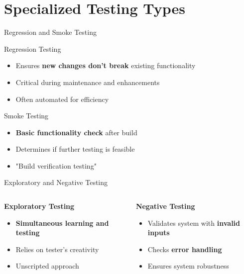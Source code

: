 \documentclass{beamer}
\begin{document}
\section{Specialized Testing Types}

\begin{frame}[t]{Regression and Smoke Testing}
\begin{block}{Regression Testing}
\begin{itemize}
\item Ensures \textbf{new changes don't break} existing functionality
\item Critical during maintenance and enhancements
\item Often automated for efficiency
\end{itemize}
\end{block}

\begin{block}{Smoke Testing}
\begin{itemize}
\item \textbf{Basic functionality check} after build
\item Determines if further testing is feasible
\item "Build verification testing"
\end{itemize}
\end{block}
\end{frame}

\begin{frame}[t]{Exploratory and Negative Testing}
\begin{columns}[T]
\begin{column}{0.48\textwidth}
\textbf{Exploratory Testing}
\begin{itemize}
\item \textbf{Simultaneous learning and testing}
\item Relies on tester's creativity
\item Unscripted approach
\end{itemize}
\end{column}
\begin{column}{0.48\textwidth}
\textbf{Negative Testing}
\begin{itemize}
\item Validates system with \textbf{invalid inputs}
\item Checks \textbf{error handling}
\item Ensures system robustness
\end{itemize}
\end{column}
\end{columns}
\end{frame}
\end{document}
